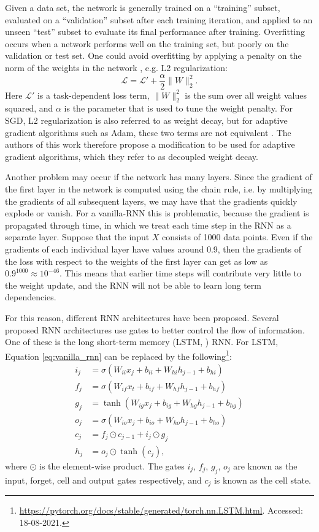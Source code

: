 Given a data set, the network is generally trained on a ``training'' subset, evaluated on a ``validation'' subset after each training iteration, and applied to an unseen ``test'' subset to evaluate its final performance after training. Overfitting occurs when a network performs well on the training set, but poorly on the validation or test set. One could avoid overfitting by applying a penalty on the norm of the weights in the network \citep{krogh1992simple}, e.g. L2 regularization:
\begin{equation}
    \mathcal{L} = \mathcal{L'} + \frac{\alpha}{2} \|W\|_2^2.
\end{equation}
Here $\mathcal{L'}$ is a task-dependent loss term, $\|W\|_2^2$ is the sum over all weight values squared, and $\alpha$ is the parameter that is used to tune the weight penalty. For SGD, L2 regularization is also referred to as weight decay, but for adaptive gradient algorithms such as Adam, these two terms are not equivalent \citep{loshchilov2017decoupled}. The authors of this work therefore propose a modification to be used for adaptive gradient algorithms, which they refer to as decoupled weight decay.

Another problem may occur if the network has many layers. Since the gradient of the first layer in the network is computed using the chain rule, i.e. by multiplying the gradients of all subsequent layers, we may have that the gradients quickly explode or vanish. For a vanilla-RNN this is problematic, because the gradient is propagated through time, in which we treat each time step in the RNN as a separate layer. Suppose that the input $X$ consists of 1000 data points. Even if the gradients of each individual layer have values around 0.9, then the gradients of the loss with respect to the weights of the first layer can get as low as $0.9^{1000}\approx10^{-46}$. This means that earlier time steps will contribute very little to the weight update, and the RNN will not be able to learn long term dependencies.

For this reason, different RNN architectures have been proposed. Several proposed RNN architectures use gates to better control the flow of information. One of these is the long short-term memory (LSTM, \cite{hochreiter1997long}) RNN. For LSTM, Equation \ref{eq:vanilla_rnn} can be replaced by the following\footnote{\url{https://pytorch.org/docs/stable/generated/torch.nn.LSTM.html}. Accessed: 18-08-2021.}: 
\begin{align}
    i_j &= \sigma(W_{ii}x_j + b_{ii} + W_{hi}h_{j-1} + b_{hi}) \\
    f_j &= \sigma(W_{if}x_t + b_{if} + W_{hf}h_{j-1} + b_{hf}) \\
    g_j &= \tanh(W_{ig}x_j + b_{ig} + W_{hg}h_{j-1} + b_{hg}) \\
    o_j &= \sigma(W_{io}x_j + b_{io} + W_{ho}h_{j-1} + b_{ho}) \\
    c_j &= f_j \odot c_{j-1} + i_j \odot g_j \\
    h_j &= o_j \odot \tanh(c_j),
\end{align}
where  $\odot$ is the element-wise product. The gates $i_j$, $f_j$, $g_j$, $o_j$ are known as the input, forget, cell and output gates respectively, and $c_j$ is known as the cell state. 

